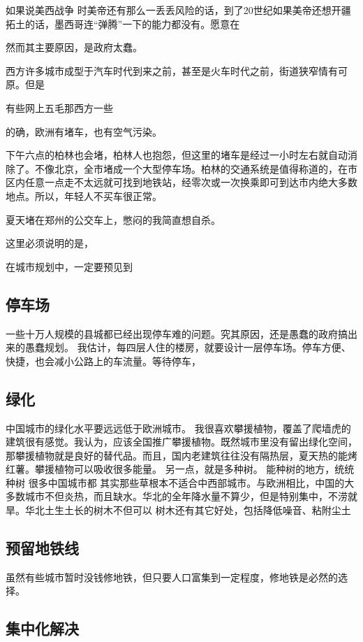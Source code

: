 如果说美西战争 时美帝还有那么一丢丢风险的话，到了20世纪如果美帝还想开疆拓土的话，墨西哥连“弹腾”一下的能力都没有。愿意在

然而其主要原因，是政府太蠢。

西方许多城市成型于汽车时代到来之前，甚至是火车时代之前，街道狭窄情有可原。但是

有些网上五毛那西方一些

的确，欧洲有堵车，也有空气污染。

下午六点的柏林也会堵，柏林人也抱怨，但这里的堵车是经过一小时左右就自动消除了。不像北京，全市堵成一个大型停车场。柏林的交通系统是值得称道的，在市区内任意一点走不太远就可找到地铁站，经零次或一次换乘即可到达市内绝大多数地点。所以，年轻人不买车很正常。

夏天堵在郑州的公交车上，憋闷的我简直想自杀。

这里必须说明的是，

在城市规划中，一定要预见到

\subsection{停车场}
一些十万人规模的县城都已经出现停车难的问题。究其原因，还是愚蠢的政府搞出来的愚蠢规划。
我估计，每四层人住的楼房，就要设计一层停车场。停车方便、快捷，也会减小公路上的车流量。等待停车，

\subsection{绿化}
中国城市的绿化水平要远远低于欧洲城市。
我很喜欢攀援植物，覆盖了爬墙虎的建筑很有感觉。我认为，应该全国推广攀援植物。既然城市里没有留出绿化空间，那攀援植物就是良好的替代品。而且，国内老建筑往往没有隔热层，夏天热的能烤红薯。攀援植物可以吸收很多能量。
另一点，就是多种树。
能种树的地方，统统种树
很多中国城市都
其实那些草根本不适合中西部城市。与欧洲相比，中国的大多数城市不但炎热，而且缺水。华北的全年降水量不算少，但是特别集中，不涝就旱。华北土生土长的树木不但可以
树木还有其它好处，包括降低噪音、粘附尘土

\subsection{预留地铁线}
虽然有些城市暂时没钱修地铁，但只要人口富集到一定程度，修地铁是必然的选择。

\subsection{集中化解决}


